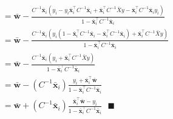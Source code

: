 \documentclass[11pt, oneside]{article}   	%
\begin{document}
\begin{gather*}
= \boldsymbol{\bar{w}} - \frac{C^{-1}\boldsymbol{\bar{x}}_i (y_i - y_i\boldsymbol{\bar{x}}_i^\top C^{-1} \boldsymbol{\bar{x}}_i + \boldsymbol{\bar{x}}_i^\top C^{-1}\bar{X}y - \boldsymbol{\bar{x}}_i^\top C^{-1}\boldsymbol{\bar{x}}_iy_i)} {1 - \boldsymbol{\bar{x}}_i^\top C^{-1} \boldsymbol{\bar{x}}_i}\\
= \boldsymbol{\bar{w}} - \frac{C^{-1}\boldsymbol{\bar{x}}_i (y_i (1 - \boldsymbol{\bar{x}}_i^\top C^{-1} \boldsymbol{\bar{x}}_i - \boldsymbol{\bar{x}}_i^\top C^{-1}\boldsymbol{\bar{x}}_i) + \boldsymbol{\bar{x}}_i^\top C^{-1}\bar{X}y)} {1 - \boldsymbol{\bar{x}}_i^\top C^{-1} \boldsymbol{\bar{x}}_i}\\
= \boldsymbol{\bar{w}} - \frac{C^{-1}\boldsymbol{\bar{x}}_i (y_i + \boldsymbol{\bar{x}}_i^\top C^{-1}\bar{X}y)} {1 - \boldsymbol{\bar{x}}_i^\top C^{-1} \boldsymbol{\bar{x}}_i}\\
= \boldsymbol{\bar{w}} - (C^{-1}\boldsymbol{\bar{x}}_i)  \frac{y_i + \boldsymbol{\bar{x}}_i^\top \boldsymbol{\bar{w}}} {1 - \boldsymbol{\bar{x}}_i^\top C^{-1} \boldsymbol{\bar{x}}_i}\\
= \boldsymbol{\bar{w}} + (C^{-1}\boldsymbol{\bar{x}}_i)  \frac{\boldsymbol{\bar{x}}_i^\top \boldsymbol{\bar{w}} - y_i} {1 - \boldsymbol{\bar{x}}_i^\top C^{-1} \boldsymbol{\bar{x}}_i} \text{ } \blacksquare
\end{gather*}
\end{document}
